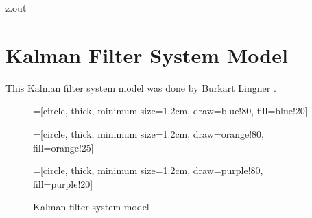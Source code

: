 \MyIO


\begin{VerbatimOut}{z.out}


\section{Kalman Filter System Model}

This Kalman filter system model was done by Burkart Lingner
\cite{lingner2010}.

%


\begin{figure}[htbp]
\caption{Kalman filter system model}
\centering
=[circle,
                                    thick,
                                    minimum size=1.2cm,
                                    draw=blue!80,
                                    fill=blue!20]

=[circle,
                                                thick,
                                                minimum size=1.2cm,
                                                draw=orange!80,
                                                fill=orange!25]

=[circle,
                                    thick,
                                    minimum size=1.2cm,
                                    draw=purple!80,
                                    fill=purple!20]


\end{figure}
\end{VerbatimOut}
